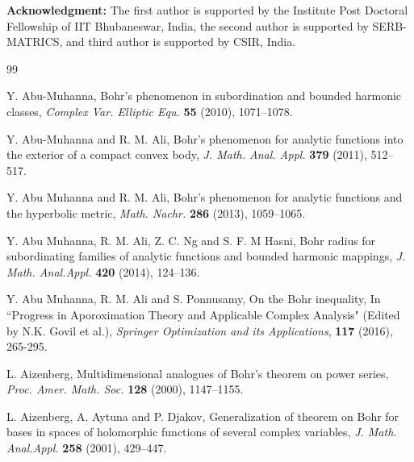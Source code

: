 \documentclass[a4paper,12pt]{amsart}
\theoremstyle{plain}
\theoremstyle{definition}
\begin{document}
\noindent\textbf{Acknowledgment:}  The first author is supported by the Institute Post Doctoral Fellowship of IIT Bhubaneswar, India, the second author is supported by SERB-MATRICS, and third author is supported by CSIR, India.


\begin{thebibliography}{99}
	
	 {\sc Y. Abu-Muhanna},  Bohr's phenomenon in subordination and bounded harmonic classes, {\it Complex Var. Elliptic Equ.} {\bf  55} (2010), 1071--1078.
	
	
	 {\sc Y. Abu-Muhanna} and  {\sc R. M. Ali}, Bohr's phenomenon for analytic functions into the exterior of a compact convex body, {\it J. Math. Anal. Appl.} {\bf  379}  (2011), 512--517.
	
	
	 {\sc Y.  Abu Muhanna} and {\sc R. M.  Ali}, Bohr's phenomenon for analytic functions and the hyperbolic metric, {\it Math. Nachr.}  {\bf 286}  (2013), 1059--1065.
	
	
	 {\sc Y. Abu Muhanna, R. M. Ali, Z. C. Ng} and  {\sc S. F. M Hasni}, Bohr radius for subordinating families of analytic functions and bounded harmonic mappings, 
	{\it J. Math. Anal.Appl.} {\bf 420} (2014), 124--136.
	
	 {\sc Y.  Abu Muhanna}, {\sc R. M.  Ali} and {\sc S. Ponnusamy}, On the Bohr inequality, In ``Progress in Aporoximation Theory and Applicable Complex Analysis" (Edited by N.K. Govil et al.), \textit{Springer Optimization and its Applications}, \textbf{117} (2016), 265-295.
	
	 {\sc L. Aizenberg}, Multidimensional analogues of Bohr's theorem on power series, \textit{Proc. Amer. Math. Soc.} {\bf 128} (2000), 1147--1155.
	
	
	 {\sc L. Aizenberg, A. Aytuna}  and {\sc P. Djakov}, Generalization of theorem on Bohr for bases in spaces of holomorphic functions of several complex variables, 
	{\it J. Math. Anal.Appl.} {\bf  258} (2001), 429--447.
	

\end{thebibliography}
\end{document}
